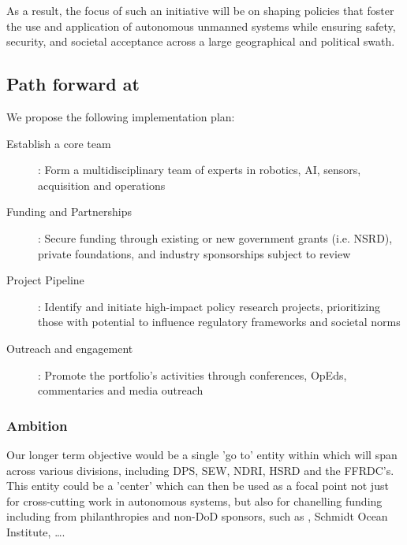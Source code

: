 \documentclass[11pt,letterpaper]{article}
\begin{document}
As a result, the focus of such an initiative will be on shaping
policies that foster the use and application of autonomous unmanned
systems while ensuring safety, security, and societal acceptance
across a large geographical and political swath.


\subsection{Path forward at \org}

We propose the following implementation plan:

\begin{description}

\item[Establish a core team]: Form a multidisciplinary team of \org
  experts in robotics, AI, sensors, acquisition and operations

\item[Funding and Partnerships]: Secure funding through existing or
  new government grants (i.e. NSRD), private foundations, and industry
  sponsorships subject to review

\item[Project Pipeline]: Identify and initiate high-impact policy
  research projects, prioritizing those with potential to influence
  regulatory frameworks and societal norms
  
\item[Outreach and engagement]: Promote the portfolio’s activities
  through conferences, OpEds, commentaries and media outreach


\end{description}

\subsubsection{Ambition}

Our longer term objective would be a single 'go to' entity within \org
which will span across various divisions, including DPS, SEW, NDRI,
HSRD and the FFRDC's. This entity could be a 'center' which can then
be used as a focal point not just for cross-cutting work in autonomous
systems, but also for chanelling funding including from philanthropies
and non-DoD sponsors, such as \noae, Schmidt Ocean Institute, \ldots.
\end{document}
